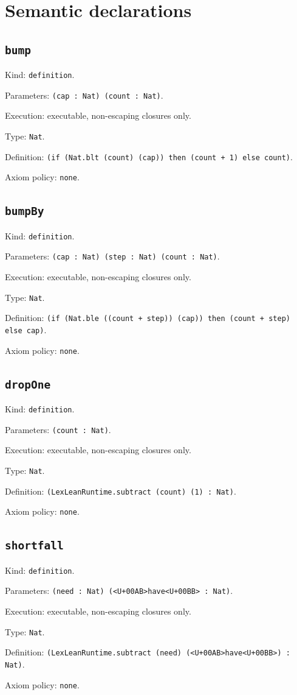 \documentclass[11pt]{article}
\begin{document}
\section*{Semantic declarations}
\subsection*{\texttt{bump}}
\noindent Kind: \texttt{definition}.\par
\noindent Parameters: \texttt{(cap : Nat) (count : Nat)}.\par
\noindent Execution: executable, non-escaping closures only.\par
\noindent Type: \texttt{Nat}.\par
\noindent Definition: \texttt{(if (Nat.blt (count) (cap)) then (count + 1) else count)}.\par
\noindent Axiom policy: \texttt{none}.\par
\subsection*{\texttt{bumpBy}}
\noindent Kind: \texttt{definition}.\par
\noindent Parameters: \texttt{(cap : Nat) (step : Nat) (count : Nat)}.\par
\noindent Execution: executable, non-escaping closures only.\par
\noindent Type: \texttt{Nat}.\par
\noindent Definition: \texttt{(if (Nat.ble ((count + step)) (cap)) then (count + step) else cap)}.\par
\noindent Axiom policy: \texttt{none}.\par
\subsection*{\texttt{dropOne}}
\noindent Kind: \texttt{definition}.\par
\noindent Parameters: \texttt{(count : Nat)}.\par
\noindent Execution: executable, non-escaping closures only.\par
\noindent Type: \texttt{Nat}.\par
\noindent Definition: \texttt{(LexLeanRuntime.subtract (count) (1) : Nat)}.\par
\noindent Axiom policy: \texttt{none}.\par
\subsection*{\texttt{shortfall}}
\noindent Kind: \texttt{definition}.\par
\noindent Parameters: \texttt{(need : Nat) (<U+00AB>have<U+00BB> : Nat)}.\par
\noindent Execution: executable, non-escaping closures only.\par
\noindent Type: \texttt{Nat}.\par
\noindent Definition: \texttt{(LexLeanRuntime.subtract (need) (<U+00AB>have<U+00BB>) : Nat)}.\par
\noindent Axiom policy: \texttt{none}.\par
\end{document}
